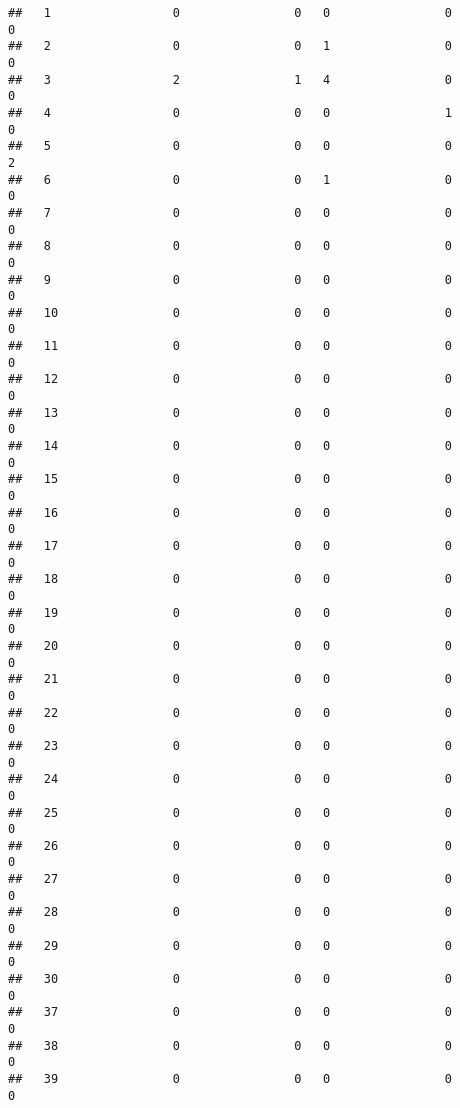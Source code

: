 \documentclass[]{article}
\begin{document}
\begin{verbatim}
##   1                 0                0   0                0                0
##   2                 0                0   1                0                0
##   3                 2                1   4                0                0
##   4                 0                0   0                1                0
##   5                 0                0   0                0                2
##   6                 0                0   1                0                0
##   7                 0                0   0                0                0
##   8                 0                0   0                0                0
##   9                 0                0   0                0                0
##   10                0                0   0                0                0
##   11                0                0   0                0                0
##   12                0                0   0                0                0
##   13                0                0   0                0                0
##   14                0                0   0                0                0
##   15                0                0   0                0                0
##   16                0                0   0                0                0
##   17                0                0   0                0                0
##   18                0                0   0                0                0
##   19                0                0   0                0                0
##   20                0                0   0                0                0
##   21                0                0   0                0                0
##   22                0                0   0                0                0
##   23                0                0   0                0                0
##   24                0                0   0                0                0
##   25                0                0   0                0                0
##   26                0                0   0                0                0
##   27                0                0   0                0                0
##   28                0                0   0                0                0
##   29                0                0   0                0                0
##   30                0                0   0                0                0
##   37                0                0   0                0                0
##   38                0                0   0                0                0
##   39                0                0   0                0                0

\end{verbatim}
\end{document}
